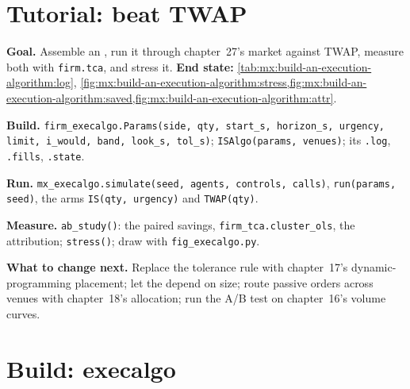 \section{Tutorial: beat TWAP}\label{tut:mx:build-an-execution-algorithm:tut}

\begin{tutorial}
\textbf{Goal.} Assemble an , run it through chapter~27's market against TWAP, measure both with \texttt{firm.tca},
and stress it. \textbf{End state:} \cref{tab:mx:build-an-execution-algorithm:log},
\cref{fig:mx:build-an-execution-algorithm:stress,fig:mx:build-an-execution-algorithm:saved,fig:mx:build-an-execution-algorithm:attr}.
\begin{tutsteps}
\item \textbf{Build.} \texttt{firm\_execalgo.Params(side, qty, start\_s, horizon\_s, urgency, limit, i\_would, band, look\_s, tol\_s)};
\texttt{ISAlgo(params, venues)}; its \texttt{.log}, \texttt{.fills}, \texttt{.state}.
\item \textbf{Run.} \texttt{mx\_execalgo.simulate(seed, agents, controls, calls)}, \texttt{run(params, seed)}, the arms \texttt{IS(qty, urgency)} and
\texttt{TWAP(qty)}.
\item \textbf{Measure.} \texttt{ab\_study()}: the paired savings, \texttt{firm\_tca.cluster\_ols}, the attribution; \texttt{stress()}; draw with
\texttt{fig\_execalgo.py}.
\end{tutsteps}
\textbf{What to change next.} Replace the tolerance rule with chapter~17's dynamic-programming placement; let the  depend on size; route
passive orders across venues with chapter~18's allocation; run the A/B test on chapter~16's volume curves.
\end{tutorial}

\section{Build: execalgo}\label{bld:mx:build-an-execution-algorithm:execalgo}

